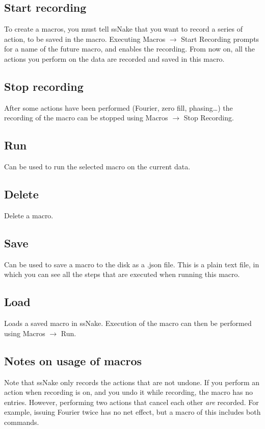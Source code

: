 \documentclass[11pt,a4paper]{article}
\begin{document}
\subsection{Start recording}
To create a macros, you must tell ssNake that you want to record a series of action, to be saved in the macro. Executing Macros $\rightarrow$ Start Recording prompts for a name of the future macro, and enables the recording. From now on, all the actions you perform on the data are recorded and saved in this macro.

\subsection{Stop recording}
After some actions have been performed (Fourier, zero fill, phasing\ldots   ) the recording of the macro can be stopped using Macros $\rightarrow$ Stop Recording. 

\subsection{Run}
Can be used to run the selected macro on the current data.

\subsection{Delete}
Delete a macro.

\subsection{Save}
Can be used to save a macro to the disk as a .json file. This is a plain text file, in which you can see all the steps that are executed when running this macro.

\subsection{Load}
Loads a saved macro in ssNake. Execution of the macro can then be performed using Macros $\rightarrow$ Run.

\subsection{Notes on usage of macros}
Note that ssNake only records the actions that are not undone. If you perform an action when recording is on, and you undo it while recording, the macro has no entries. However, performing two actions that cancel each other \textit{are} recorded. For example, issuing Fourier twice has no net effect, but a macro of this includes both commands.
\end{document}
